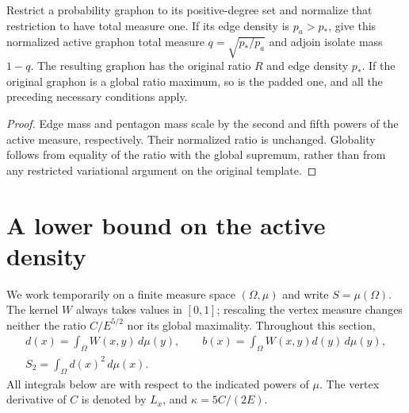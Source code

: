 \begin{lemma}[Padding]\label{lem:padding}
Restrict a probability graphon to its positive-degree set and normalize
that restriction to have total measure one. If its edge density is
\(p_a>p_*\), give this normalized active graphon total measure
\(q=\sqrt{p_*/p_a}\) and adjoin isolate mass \(1-q\). The resulting graphon
has the original ratio \(R\) and edge density \(p_*\). If the original
graphon is a global ratio maximum, so is the padded one, and all the
preceding necessary conditions apply.
\end{lemma}
\begin{proof}
Edge mass and pentagon mass scale by the second and fifth powers of the
active measure, respectively. Their normalized ratio is unchanged.
Globality follows from equality of the ratio with the global supremum,
rather than from any restricted variational argument on the original
template.
\end{proof}

\section{A lower bound on the active density}

We work temporarily on a finite measure space \((\Omega,\mu)\) and write
\(S=\mu(\Omega)\). The kernel \(W\) always takes values in \([0,1]\);
rescaling the vertex measure changes neither the ratio \(C/E^{5/2}\) nor
its global maximality. Throughout this section,
\[
 \begin{gathered}
 d(x)=\int_\Omega W(x,y)\,d\mu(y),\qquad
 b(x)=\int_\Omega W(x,y)d(y)\,d\mu(y),\\
 S_2=\int_\Omega d(x)^2\,d\mu(x).
 \end{gathered}
\]
All integrals below are with respect to the indicated powers of \(\mu\).
The vertex derivative of \(C\) is denoted by \(L_x\), and
\(\kappa=5C/(2E)\).


